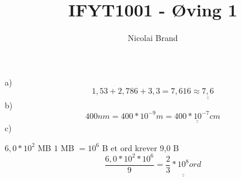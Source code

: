 \documentclass{article}
\author{Nicolai Brand}
\title{IFYT1001 - Øving 1}
\def\doubleunderline#1{\underline{\underline{#1}}}
\begin{document}
\maketitle

\section{}
\hspace*{10mm}a)
$$ 1,53 + 2,786 + 3,3 = 7,616 \approx \doubleunderline{7,6} $$
\hspace*{10mm}b)
$$ 400 nm = 400 * 10^{-9} m = \doubleunderline{400 * 10^{-7}cm} $$
\hspace*{10mm}c)


\hspace*{20mm}$ 6,0 * 10^2 $ MB
\hspace*{10mm}$ 1 $ MB $ = 10^6 $ B
\hspace*{10mm} et ord krever 9,0 B
$$ \frac{6,0 * 10^2 * 10^6}{9} = \doubleunderline{\frac{2}{3} * 10^8 ord}$$

\section{}
\end{document}
